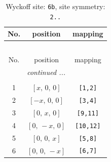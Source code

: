 \documentclass[fleqn,8pt]{jsarticle}
\begin{document}
\renewcommand{\arraystretch}{1.2}
\begin{longtable}{ccc}
\caption{Wyckoff site: {\tt 6b}, site symmetry: {\tt 2..}}
 \\
 \hline \hline
No. & position & mapping \\ \hline \endfirsthead

\multicolumn{2}{l}{\tablename\ \thetable{}} \\
 \hline \hline
No. & position & mapping \\ \hline \endhead

 \hline \hline
\multicolumn{2}{r}{\footnotesize\it continued ...} \\ \endfoot

 \hline \hline
\multicolumn{2}{r}{} \\ \endlastfoot

1 & $\left[ x,\, 0,\, 0 \right]$ & {\tt [1,2]} \\ \hline
2 & $\left[ - x,\, 0,\, 0 \right]$ & {\tt [3,4]} \\ \hline
3 & $\left[ 0,\, x,\, 0 \right]$ & {\tt [9,11]} \\ \hline
4 & $\left[ 0,\, - x,\, 0 \right]$ & {\tt [10,12]} \\ \hline
5 & $\left[ 0,\, 0,\, x \right]$ & {\tt [5,8]} \\ \hline
6 & $\left[ 0,\, 0,\, - x \right]$ & {\tt [6,7]} \\
\end{longtable}
\renewcommand{\arraystretch}{1.2}
\end{document}
